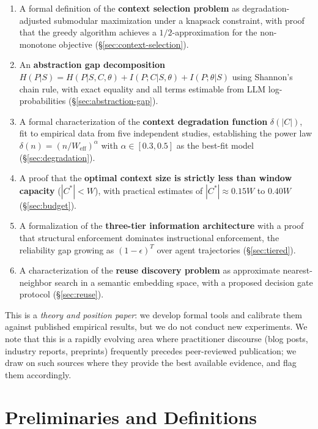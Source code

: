 \documentclass[11pt, a4paper, logo, copyright]{googledeepmind}
\begin{document}
\begin{enumerate}
    \item A formal definition of the \textbf{context selection problem} as degradation-adjusted submodular maximization under a knapsack constraint, with proof that the greedy algorithm achieves a $1/2$-approximation for the non-monotone objective (\S\ref{sec:context-selection}).
    \item An \textbf{abstraction gap decomposition} $H(P|S) = H(P|S,C,\theta) + I(P;C|S,\theta) + I(P;\theta|S)$ using Shannon's chain rule, with exact equality and all terms estimable from LLM log-probabilities (\S\ref{sec:abstraction-gap}).
    \item A formal characterization of the \textbf{context degradation function} $\delta(|C|)$, fit to empirical data from five independent studies, establishing the power law $\delta(n) = (n/W_{\text{eff}})^\alpha$ with $\alpha \in [0.3, 0.5]$ as the best-fit model (\S\ref{sec:degradation}).
    \item A proof that the \textbf{optimal context size is strictly less than window capacity} ($|C^*| < W$), with practical estimates of $|C^*| \approx 0.15W$ to $0.40W$ (\S\ref{sec:budget}).
    \item A formalization of the \textbf{three-tier information architecture} with a proof that structural enforcement dominates instructional enforcement, the reliability gap growing as $(1-\epsilon)^T$ over agent trajectories (\S\ref{sec:tiered}).
    \item A characterization of the \textbf{reuse discovery problem} as approximate nearest-neighbor search in a semantic embedding space, with a proposed decision gate protocol (\S\ref{sec:reuse}).
\end{enumerate}

This is a \emph{theory and position paper}: we develop formal tools and calibrate them against published empirical results, but we do not conduct new experiments. We note that this is a rapidly evolving area where practitioner discourse (blog posts, industry reports, preprints) frequently precedes peer-reviewed publication; we draw on such sources where they provide the best available evidence, and flag them accordingly.


\section{Preliminaries and Definitions}
\label{sec:preliminaries}
\end{document}
